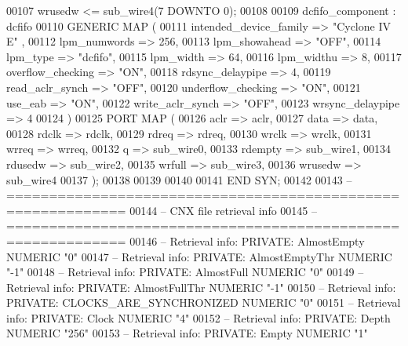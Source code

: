 \begin{DoxyCode}
{00107     \textcolor{vhdlchar}{wrusedw}    \textcolor{vhdlchar}{<=} \textcolor{vhdlchar}{sub_wire4}\textcolor{vhdlchar}{(}\textcolor{vhdllogic}{}\textcolor{vhdllogic}{7} \textcolor{keywordflow}{DOWNTO} \textcolor{vhdllogic}{}\textcolor{vhdllogic}{0}\textcolor{vhdlchar}{)};
00108 
00109     dcfifo_component : dcfifo
00110     \textcolor{keywordflow}{GENERIC} \textcolor{keywordflow}{MAP} (
00111         intended\_device\_family => \textcolor{keyword}{"Cyclone IV E"}  ,
00112         lpm\_numwords => \textcolor{vhdllogic}{256},
00113         lpm\_showahead => \textcolor{keyword}{"OFF"},
00114         lpm\_type => \textcolor{keyword}{"dcfifo"},
00115         lpm\_width => \textcolor{vhdllogic}{64},
00116         lpm\_widthu => \textcolor{vhdllogic}{8},
00117         overflow\_checking => \textcolor{keyword}{"ON"},
00118         rdsync\_delaypipe => \textcolor{vhdllogic}{4},
00119         read\_aclr\_synch => \textcolor{keyword}{"OFF"},
00120         underflow\_checking => \textcolor{keyword}{"ON"},
00121         use\_eab => \textcolor{keyword}{"ON"},
00122         write\_aclr\_synch => \textcolor{keyword}{"OFF"},
00123         wrsync\_delaypipe => \textcolor{vhdllogic}{4}
00124     \textcolor{vhdlchar}{)}
00125     \textcolor{keywordflow}{PORT} \textcolor{keywordflow}{MAP} (
00126         aclr => aclr,
00127         data => data,
00128         rdclk => rdclk,
00129         rdreq => rdreq,
00130         wrclk => wrclk,
00131         wrreq => wrreq,
00132         q => sub_wire0,
00133         rdempty => sub_wire1,
00134         rdusedw => sub_wire2,
00135         wrfull => sub_wire3,
00136         wrusedw => sub_wire4
00137     \textcolor{vhdlchar}{)};
00138 
00139 
00140 
00141 \textcolor{keywordflow}{END} \textcolor{vhdlchar}{SYN};
00142 
00143 \textcolor{keyword}{-- ============================================================}
00144 \textcolor{keyword}{-- CNX file retrieval info}
00145 \textcolor{keyword}{-- ============================================================}
00146 \textcolor{keyword}{-- Retrieval info: PRIVATE: AlmostEmpty NUMERIC "0"}
00147 \textcolor{keyword}{-- Retrieval info: PRIVATE: AlmostEmptyThr NUMERIC "-1"}
00148 \textcolor{keyword}{-- Retrieval info: PRIVATE: AlmostFull NUMERIC "0"}
00149 \textcolor{keyword}{-- Retrieval info: PRIVATE: AlmostFullThr NUMERIC "-1"}
00150 \textcolor{keyword}{-- Retrieval info: PRIVATE: CLOCKS\_ARE\_SYNCHRONIZED NUMERIC "0"}
00151 \textcolor{keyword}{-- Retrieval info: PRIVATE: Clock NUMERIC "4"}
00152 \textcolor{keyword}{-- Retrieval info: PRIVATE: Depth NUMERIC "256"}
00153 \textcolor{keyword}{-- Retrieval info: PRIVATE: Empty NUMERIC "1"}
}
\end{DoxyCode}

